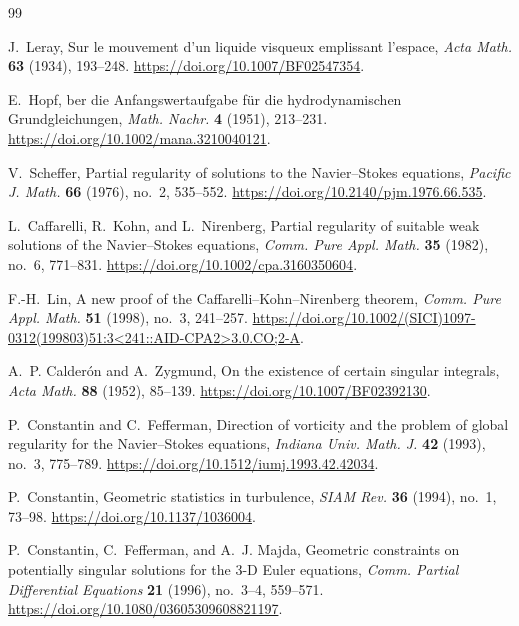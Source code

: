 \documentclass[11pt]{article}
\numberwithin{equation}{section}
\theoremstyle{plain}
\theoremstyle{definition}
\theoremstyle{remark}
\begin{document}
\begin{thebibliography}{99}

J.~Leray,
\newblock Sur le mouvement d'un liquide visqueux emplissant l'espace,
\newblock \emph{Acta Math.} \textbf{63} (1934), 193--248.
\newblock \url{https://doi.org/10.1007/BF02547354}.

E.~Hopf,
ber die Anfangswertaufgabe f{\"u}r die hydrodynamischen Grundgleichungen,
\newblock \emph{Math. Nachr.} \textbf{4} (1951), 213--231.
\newblock \url{https://doi.org/10.1002/mana.3210040121}.

V.~Scheffer,
\newblock Partial regularity of solutions to the Navier--Stokes equations,
\newblock \emph{Pacific J. Math.} \textbf{66} (1976), no.~2, 535--552.
\newblock \url{https://doi.org/10.2140/pjm.1976.66.535}.

L.~Caffarelli, R.~Kohn, and L.~Nirenberg,
\newblock Partial regularity of suitable weak solutions of the Navier--Stokes equations,
\newblock \emph{Comm. Pure Appl. Math.} \textbf{35} (1982), no.~6, 771--831.
\newblock \url{https://doi.org/10.1002/cpa.3160350604}.

F.-H.~Lin,
\newblock A new proof of the Caffarelli--Kohn--Nirenberg theorem,
\newblock \emph{Comm. Pure Appl. Math.} \textbf{51} (1998), no.~3, 241--257.
\newblock \url{https://doi.org/10.1002/(SICI)1097-0312(199803)51:3<241::AID-CPA2>3.0.CO;2-A}.

A.~P. Calder\'on and A.~Zygmund,
\newblock On the existence of certain singular integrals,
\newblock \emph{Acta Math.} \textbf{88} (1952), 85--139.
\newblock \url{https://doi.org/10.1007/BF02392130}.

P.~Constantin and C.~Fefferman,
\newblock Direction of vorticity and the problem of global regularity for the Navier--Stokes equations,
\newblock \emph{Indiana Univ. Math. J.} \textbf{42} (1993), no.~3, 775--789.
\newblock \url{https://doi.org/10.1512/iumj.1993.42.42034}.

P.~Constantin,
\newblock Geometric statistics in turbulence,
\newblock \emph{SIAM Rev.} \textbf{36} (1994), no.~1, 73--98.
\newblock \url{https://doi.org/10.1137/1036004}.

P.~Constantin, C.~Fefferman, and A.~J. Majda,
\newblock Geometric constraints on potentially singular solutions for the 3-D Euler equations,
\newblock \emph{Comm. Partial Differential Equations} \textbf{21} (1996), no.~3--4, 559--571.
\newblock \url{https://doi.org/10.1080/03605309608821197}.


\end{thebibliography}
\end{document}
